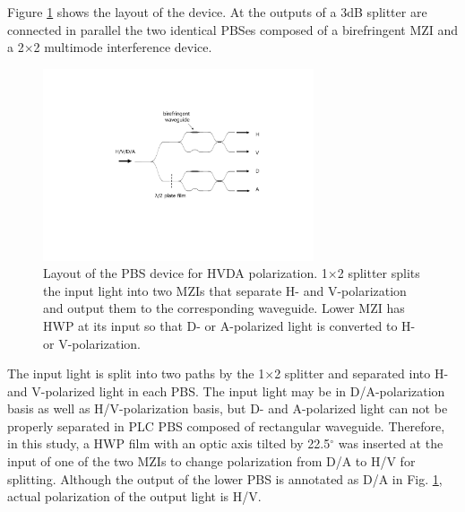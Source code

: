 \documentclass[letterpaper, 10pt]{article}
\begin{document}
Figure \ref{fig:layout} shows the layout of the device.
At the outputs of a 3dB splitter are connected in parallel the two identical PBSes composed of a birefringent MZI and a 2$\times$2 multimode interference device.
\begin{figure}
  \centering
  \includegraphics[width=8cm]{./layout}
  \caption{Layout of the PBS device for HVDA polarization. 1$\times$2 splitter splits the input light into two MZIs that separate H- and V-polarization and output them to the corresponding waveguide. Lower MZI has HWP at its input so that D- or A-polarized light is converted to H- or V-polarization.}
  \label{fig:layout}
\end{figure}
The input light is split into two paths by the 1$\times$2 splitter and separated into H-and V-polarized light in each PBS.
The input light may be in D/A-polarization basis as well as H/V-polarization basis, but D- and A-polarized light can not be properly separated in PLC PBS composed of rectangular waveguide.
Therefore, in this study, a HWP film with an optic axis tilted by 22.5$^\circ$ was inserted at the input of one of the two MZIs to change polarization from D/A to H/V for splitting.
Although the output of the lower PBS is annotated as D/A in Fig. \ref{fig:layout}, actual polarization of the output light is H/V.
\end{document}

